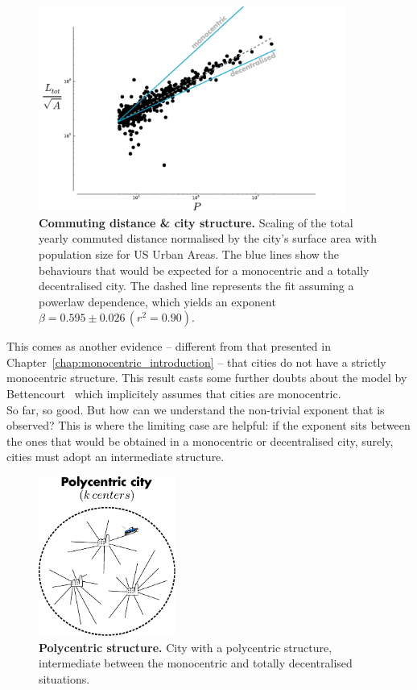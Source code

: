 \begin{figure}
    \centering
    \includegraphics[width=0.9\textwidth]{gfx/chapter-scaling/scaling_commuting_norm.pdf}
    \caption{{\bf Commuting distance \& city structure.} Scaling of the total yearly commuted distance normalised by the
    city's surface area with population size for US Urban Areas. The blue lines
show the behaviours that would be expected for a monocentric and a totally
decentralised city. The dashed line represents the fit assuming a powerlaw
dependence, which yields an exponent $\beta =  0.595 \pm 0.026\, (r^2 =
0.90)$.\label{fig:scaling_Ltot_norm}}
    
\end{figure}

This comes as another evidence -- different from that presented in
Chapter~\ref{chap:monocentric_introduction} -- that cities do not have a
strictly monocentric structure. This result casts some further doubts about the
model by Bettencourt~\cite{Bettencourt:2013} which implicitely assumes that
cities are monocentric.\\

So far, so good. But how can we understand the non-trivial exponent that is observed? This is
where the limiting case are helpful: if the exponent sits between the ones that
would be obtained in a monocentric or decentralised city, surely, cities must
adopt an intermediate structure. 

\begin{figure}[!h]
    \centering
    \includegraphics[width=0.4\textwidth]{gfx/chapter-scaling/polycentric.pdf}
    \caption{{\bf Polycentric structure.} City with a polycentric structure, intermediate between the
    monocentric and totally decentralised situations. \label{fig:polycentric}}
\end{figure}

